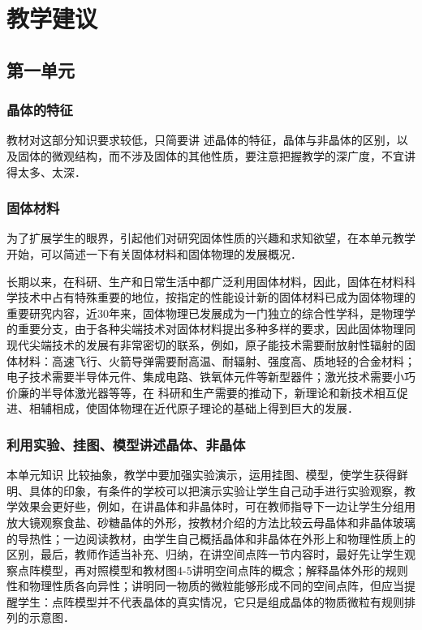 \section{教学建议}
\subsection{第一单元}
\subsubsection{晶体的特征}

教材对这部分知识要求较低，只简要讲
述晶体的特征，晶体与非晶体的区别，以及固体的微观结构，而不涉及固体的其他性质，要注意把握教学的深广度，不宜讲得太多、太深．

\subsubsection{固体材料}
 为了扩展学生的眼界，引起他们对研究固体性质的兴趣和求知欲望，在本单元教学开始，可以简述一下有关固体材料和固体物理的发展概况．

 长期以来，在科研、生产和日常生活中都广泛利用固体材料，因此，固体在材料科学技术中占有特殊重要的地位，按指定的性能设计新的固体材料已成为固体物理的重要研究内容，近30年来，固体物理已发展成为一门独立的综合性学科，是物理学的重要分支，由于各种尖端技术对固体材料提出多种多样的要求，因此固体物理同现代尖端技术的发展有非常密切的联系，例如，原子能技术需要耐放射性辐射的固体材料：高速飞行、火箭导弹需要耐高温、耐辐射、强度高、质地轻的合金材料；电子技术需要半导体元件、集成电路、铁氧体元件等新型器件；激光技术需要小巧价廉的半导体激光器等等，在
 科研和生产需要的推动下，新理论和新技术相互促进、相辅相成，使固体物理在近代原子理论的基础上得到巨大的发展．

 \subsubsection{利用实验、挂图、模型讲述晶体、非晶体}
 
 本单元知识
 比较抽象，教学中要加强实验演示，运用挂图、模型，使学生获得鲜明、具体的印象，有条件的学校可以把演示实验让学生自己动手进行实验观察，教学效果会更好些，例如，在讲晶体和非晶体时，可在教师指导下一边让学生分组用放大镜观察食盐、砂糖晶体的外形，按教材介绍的方法比较云母晶体和非晶体玻璃的导热性；一边阅读教材，由学生自己概括晶体和非晶体在外形上和物理性质上的区别，最后，教师作适当补充、归纳，在讲空间点阵一节内容时，最好先让学生观察点阵模型，再对照模型和教材图4-5讲明空间点阵的概念；解释晶体外形的规则性和物理性质各向异性；讲明同一物质的微粒能够形成不同的空间点阵，但应当提醒学生：点阵模型并不代表晶体的真实情况，它只是组成晶体的物质微粒有规则排列的示意图．

